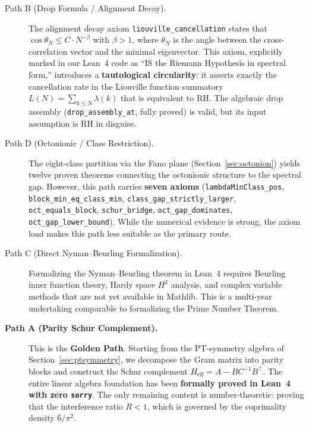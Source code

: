 \documentclass[11pt,a4paper]{article}
\theoremstyle{definition}
\theoremstyle{remark}
\newcommand{\lean}[1]{\texttt{#1}}
\begin{document}
\begin{description}
  \item[Path B (Drop Formula / Alignment Decay).]
  The alignment decay axiom \lean{liouville\_cancellation} states that
  $\cos\theta_N \leq C \cdot N^{-\beta}$ with $\beta > 1$, where
  $\theta_N$ is the angle between the cross-correlation vector and
  the minimal eigenvector. This axiom, explicitly marked in our Lean~4
  code as ``IS the Riemann Hypothesis in spectral form,'' introduces
  a \textbf{tautological circularity}: it asserts exactly the
  cancellation rate in the Liouville function summatory $L(N) =
  \sum_{k \leq N}\lambda(k)$ that is equivalent to RH. The algebraic
  drop assembly (\lean{drop\_assembly\_at}, fully proved) is valid,
  but its input assumption is RH in disguise.

  \item[Path D (Octonionic / Class Restriction).]
  The eight-class partition via the Fano plane
  (Section~\ref{sec:octonion}) yields twelve proven theorems
  connecting the octonionic structure to the spectral gap. However,
  this path carries \textbf{seven axioms}
  (\lean{lambdaMinClass\_pos}, \lean{block\_min\_eq\_class\_min},
  \lean{class\_gap\_strictly\_larger}, \lean{oct\_equals\_block},
  \lean{schur\_bridge}, \lean{oct\_gap\_dominates},
  \lean{oct\_gap\_lower\_bound}). While the numerical evidence is
  strong, the axiom load makes this path less suitable as the
  primary route.

  \item[Path C (Direct Nyman--Beurling Formalization).]
  Formalizing the Nyman--Beurling theorem in Lean~4 requires
  Beurling inner function theory, Hardy space $H^2$ analysis,
  and complex variable methods that are not yet available in
  Mathlib. This is a multi-year undertaking comparable to
  formalizing the Prime Number Theorem.

  \item[\textbf{Path A (Parity Schur Complement).}]
  This is the \textbf{Golden Path}. Starting from the PT-symmetry
  algebra of Section~\ref{sec:ptsymmetry}, we decompose the Gram
  matrix into parity blocks and construct the Schur complement
  $H_{\mathrm{eff}} = A - BC^{-1}B^\top$. The entire linear algebra
  foundation has been \textbf{formally proved in Lean~4 with zero
  \texttt{sorry}}. The only remaining content is number-theoretic:
  proving that the interference ratio $R < 1$, which is governed
  by the coprimality density $6/\pi^2$.
\end{description}
\end{document}
